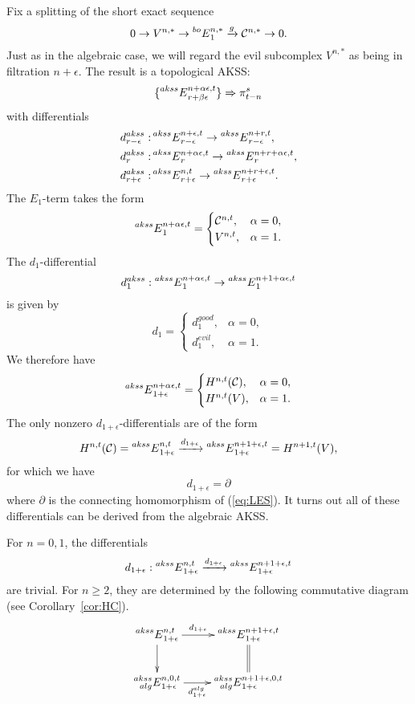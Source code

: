 Fix a splitting of the short exact sequence
\begin{equation}\label{eq:topSES} 
0 \rightarrow V^{n,*} \rightarrow \prescript{bo}{}{E}^{n,*}_1 \xrightarrow{g} \mathcal{C}^{n,*} \rightarrow 0.
\end{equation}
Just as in the algebraic case, we will regard the evil subcomplex $V^{n,*}$ as being in filtration $n + \epsilon$.
The result is a topological AKSS:
$$ \{ \prescript{akss}{}{E}^{n+\alpha\epsilon,t}_{r + \beta \epsilon} \} \Rightarrow \pi_{t-n}^s $$
with differentials 
\begin{align*}
d^{akss}_{r-\epsilon}:  & \prescript{akss}{}{E}_{r - \epsilon}^{n+ \epsilon,t} \rightarrow \prescript{akss}{}{E}_{r- \epsilon}^{n+r,t}, \\
d^{akss}_{r}:  & \prescript{akss}{}{E}_{r}^{n+ \alpha\epsilon,t} \rightarrow \prescript{akss}{}{E}_{r}^{n+r +\alpha\epsilon, t}, \\
d^{akss}_{r+\epsilon}:  & \prescript{akss}{}{E}_{r+\epsilon}^{n, t} \rightarrow \prescript{akss}{}{E}_{r+ \epsilon}^{n+r +\epsilon, t}.
\end{align*}
The $E_1$-term takes the form
$$\prescript{akss}{}{E}^{n+\alpha \epsilon, t}_1 = 
\begin{cases}
\mathcal{C}^{n,t}, & \alpha = 0, \\
V^{n, t}, & \alpha = 1. 
\end{cases}
$$
The $d_1$-differential 
$$ d^{akss}_{1}: \prescript{akss}{}{E}^{n+\alpha \epsilon, t}_1 \rightarrow \prescript{akss}{}{E}^{n+ 1+\alpha\epsilon, t}_1
$$
is given by
$$d_1 = 
\begin{cases}
d_1^{good}, & \alpha = 0, \\
d_1^{evil}, & \alpha = 1. 
\end{cases}
$$
We therefore have
$$\prescript{akss}{}{E}^{n+\alpha \epsilon, t}_{1+\epsilon} = 
\begin{cases}
H^{n,t}(\mathcal{C}), & \alpha = 0, \\
H^{n, t}(V), & \alpha = 1.
\end{cases}
$$
The only nonzero $d_{1+\epsilon}$-differentials are of the form
$$ H^{n, t}(\mathcal{C}) = \prescript{akss}{}{E}^{n, t}_{1+\epsilon} \xrightarrow{d_{1+\epsilon}} \prescript{akss}{}{E}^{n+1 + \epsilon, t}_{1+\epsilon} = H^{n+1, t}(V), $$
for which we have 
$$ d_{1+\epsilon} = \partial $$
where $\partial$ is the connecting homomorphism of (\ref{eq:LES}).  It turns out all of these differentials can be derived from the algebraic AKSS.


\begin{lem}
For $n = 0,1$, the differentials
$$ d_{1+\epsilon}: \prescript{akss}{}{E}^{n, t}_{1+\epsilon} \xrightarrow{d_{1+\epsilon}} \prescript{akss}{}{E}^{n+1 + \epsilon, t}_{1+\epsilon} $$
are trivial.  For $n \ge 2$, they are determined by the following commutative diagram (see Corollary~\ref{cor:HC}).
$$
\xymatrix{
\E{akss}{}^{n, t}_{1+\epsilon} \ar[d] \ar[r]^-{d_{1+\epsilon}} &
\E{akss}{}^{n+1 + \epsilon, t}_{1+\epsilon} \ar@{=}[d] \\
\E{akss}{alg}^{n,{0}, t}_{1+\epsilon}  \ar[r]_-{d^{alg}_{1+\epsilon}} &
\E{akss}{alg}^{n+1 + \epsilon, {0}, t}_{1+\epsilon}
}
$$
\end{lem}

